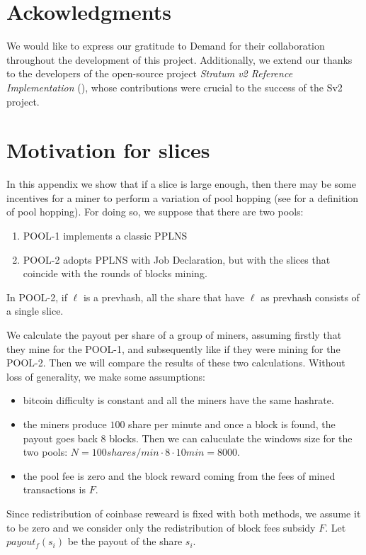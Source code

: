 \documentclass[11pt]{article}
\begin{document}
\section{Ackowledgments}
We would like to express our gratitude to Demand \cite{demand} for their collaboration throughout the development of this project. Additionally, we extend our thanks to the developers of the open-source project \emph{Stratum v2 Reference Implementation} (\cite{sv2}), whose contributions were crucial to the success of the Sv2 project.


\appendix
\section{Motivation for slices}
In this appendix we show that if a slice is large enough, then there may be some incentives for a miner to perform a variation of pool hopping (see \cite{rosenfeld} for a definition of pool hopping). For doing so, we suppose that there are two pools:
\begin{enumerate}
	\item POOL-1 implements a classic PPLNS
	\item POOL-2 adopts PPLNS with Job Declaration, but with the slices that coincide with the rounds of blocks mining.
\end{enumerate}
In POOL-2, if $\ell$ is a prevhash, all the share that have $\ell$ as prevhash consists of a single slice.

We calculate the payout per share of a group of miners, assuming firstly that they mine for the POOL-1, and subsequently like if they were mining for the POOL-2. Then we will compare the results of these two calculations. Without loss of generality, we make some assumptions:
\begin{itemize}
	\item bitcoin difficulty is constant and all the miners have the same hashrate.
	\item the miners produce $100$ share per minute and once a block is found, the payout goes back $8$ blocks. Then we can caluculate the windows size for the two pools: $N = 100 shares/min \cdot 8 \cdot 10min = 8000$.
	\item the pool fee is zero and the block reward coming from the fees of mined transactions is $F$.

\end{itemize}
Since redistribution of coinbase reweard is fixed with both methods, we assume it to be zero and we consider only the redistribution of block fees subsidy $F$.
Let $payout_f(s_i)$ be the payout of the share $s_i$.
\end{document}
